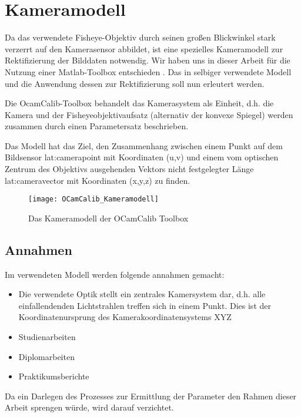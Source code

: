 \section{Kameramodell}
Da das verwendete Fisheye-Objektiv durch seinen großen Blickwinkel stark verzerrt auf den Kamerasensor abbildet, ist eine spezielles Kameramodell zur Rektifizierung der Bilddaten notwendig. Wir haben uns in dieser Arbeit für die Nutzung einer Matlab-Toolbox entschieden  \autocite{OCamCalibOmnidirectionalCamera, scaramuzzaFlexibleTechniqueAccurate2006, scaramuzzaToolboxEasilyCalibrating2006, scaramuzzaOmnidirectionalVisionCalibration2007, rufliAutomaticDetectionCheckerboards2008}. Das in selbiger verwendete Modell und die Anwendung dessen zur Rektifizierung soll nun erleutert werden. 

Die OcamCalib-Toolbox behandelt das Kamerasystem als Einheit, d.h. die Kamera und der Fisheyeobjektivaufsatz (alternativ der konvexe Spiegel) werden zusammen durch einen Parametersatz beschrieben.

Das Modell hat das Ziel, den Zusammenhang zwischen einem Punkt auf dem Bildsensor \gls{lat:camerapoint} mit Koordinaten (u,v) und einem vom optischen Zentrum des Objektivs ausgehenden Vektors nicht festgelegter Länge \gls{lat:cameravector} mit Koordinaten (x,y,z) zu finden.

\begin{figure}[htb]
  \centering
  \texttt{[image: OCamCalib\_Kameramodell]}
  \caption{Das Kameramodell der OCamCalib Toolbox}
  \label{fig:kameramodell}
\end{figure}

\subsection{Annahmen}
Im verwendeten Modell werden folgende annahmen gemacht:
\begin{itemize}
\item Die verwendete Optik stellt ein zentrales Kamersystem dar, d.h. alle einfallendenden Lichtstrahlen treffen sich in einem Punkt. Dies ist der Koordinatenursprung des Kamerakoordinatensystems XYZ
\item Studienarbeiten
\item Diplomarbeiten
\item Praktikumsberichte
\end{itemize}

Da ein Darlegen des Prozesses zur Ermittlung der Parameter den Rahmen dieser Arbeit sprengen würde, wird darauf verzichtet.